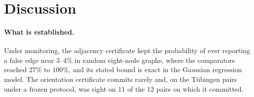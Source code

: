 
\section{Discussion}\label{sec:discussion}

\paragraph{What is established.} Under monitoring, the adjacency certificate
kept the probability of ever reporting a false edge near $3$--$4\%$ in
random eight-node graphs, where the comparators reached $27\%$ to $100\%$, and
its stated bound is exact in the Gaussian regression model. The orientation
certificate commits rarely and, on the Tübingen pairs under a frozen protocol,
was right on $11$ of the $12$ pairs on which it committed.

